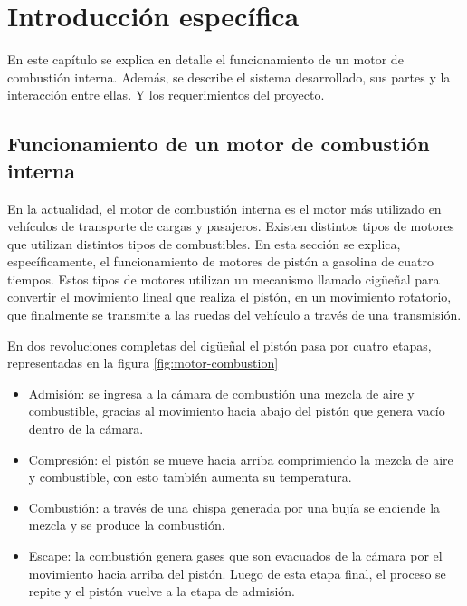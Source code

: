 \chapter{Introducción específica} %

\label{Chapter2}

En este capítulo se explica en detalle el funcionamiento de un motor de combustión interna. Además, se describe el sistema desarrollado, sus partes y la interacción entre ellas. Y los requerimientos del proyecto.

\section{Funcionamiento de un motor de combustión interna} \label{func-motor}

En la actualidad, el motor de combustión interna es el motor más utilizado en vehículos de transporte de cargas y pasajeros. Existen distintos tipos de motores que utilizan distintos tipos de combustibles. En esta sección se explica, específicamente, el funcionamiento de motores de pistón a gasolina de cuatro tiempos. Estos tipos de motores utilizan un mecanismo llamado cigüeñal para convertir el movimiento lineal que realiza el pistón, en un movimiento rotatorio, que finalmente se transmite a las ruedas del vehículo a través de una transmisión.

En dos revoluciones completas del cigüeñal el pistón pasa por cuatro etapas, representadas en la figura \ref{fig:motor-combustion}
\begin{itemize}
\item{Admisión:} se ingresa a la cámara de combustión una mezcla de aire y combustible, gracias al movimiento hacia abajo del pistón que genera vacío dentro de la cámara.
\item{Compresión:} el pistón se mueve hacia arriba comprimiendo la mezcla de aire y combustible, con esto también aumenta su temperatura.
\item{Combustión:} a través de una chispa generada por una bujía se enciende la mezcla y se produce la combustión.
\item{Escape:} la combustión genera gases que son evacuados de la cámara por el movimiento hacia arriba del pistón. Luego de esta etapa final, el proceso se repite y el pistón vuelve a la etapa de admisión.
\end{itemize}

\break

